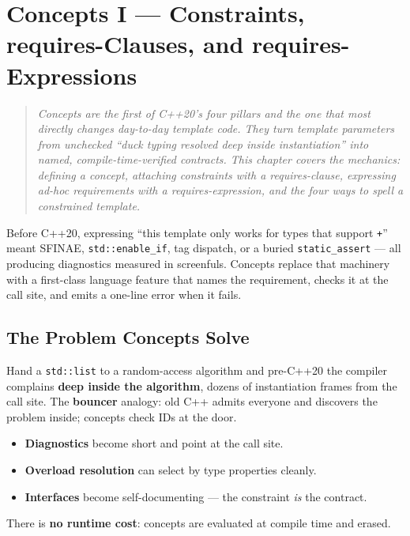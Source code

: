 \chapter{Concepts I --- Constraints, requires-Clauses, and requires-Expressions}
\label{ch:c20-concepts-i}

\begin{quote}
\emph{Concepts are the first of C++20's four pillars and the one that most directly changes day-to-day template code. They turn template parameters from unchecked ``duck typing resolved deep inside instantiation'' into named, compile-time-verified contracts. This chapter covers the mechanics: defining a concept, attaching constraints with a requires-clause, expressing ad-hoc requirements with a requires-expression, and the four ways to spell a constrained template.}
\end{quote}

Before C++20, expressing ``this template only works for types that support \texttt{+}'' meant SFINAE, \texttt{std::enable\_if}, tag dispatch, or a buried \texttt{static\_assert} --- all producing diagnostics measured in screenfuls. Concepts replace that machinery with a first-class language feature that names the requirement, checks it at the call site, and emits a one-line error when it fails.

\section{The Problem Concepts Solve}
\label{sec:c20-concepts-problem}

Hand a \texttt{std::list} to a random-access algorithm and pre-C++20 the compiler complains \textbf{deep inside the algorithm}, dozens of instantiation frames from the call site. The \textbf{bouncer} analogy: old C++ admits everyone and discovers the problem inside; concepts check IDs at the door.

\begin{itemize}
\item \textbf{Diagnostics} become short and point at the call site.
\item \textbf{Overload resolution} can select by type properties cleanly.
\item \textbf{Interfaces} become self-documenting --- the constraint \emph{is} the contract.
\end{itemize}

There is \textbf{no runtime cost}: concepts are evaluated at compile time and erased.

